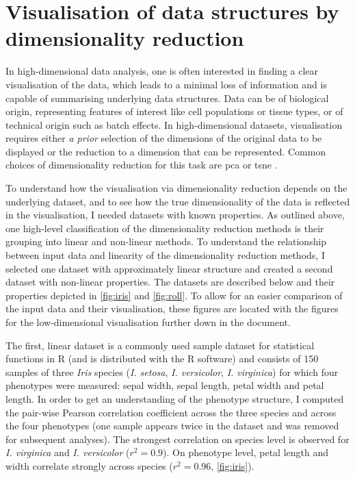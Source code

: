 \section{Visualisation of data structures by dimensionality reduction}
\label{section:visualisation}
In high-dimensional data analysis, one is often interested in finding a clear visualisation of the data, which leads to a minimal loss of information and is capable of summarising underlying data structures. Data can be of biological origin, representing features of interest like cell populations or tissue types, or of technical origin such as batch effects. In high-dimensional datasets, visualisation requires either \textit{a prior} selection of the dimensions of the original data to be displayed or the reduction to a dimension that can be represented. Common choices of dimensionality reduction for this task are \gls{pca} or \gls{tsne} \citep{Deng2014,Crowley2015,Corces2016,Martinez-Jimenez2017,Huisman2017}. 

To understand how the visualisation via dimensionality reduction depends on the underlying dataset, and to see how the true dimensionality of the data is reflected in the visualisation, I needed datasets with known properties. 
As outlined above, one high-level classification of the dimensionality reduction methods is their grouping into linear and non-linear methods. To understand the relationship between input data and linearity of the dimensionality reduction methods, I selected one dataset with approximately linear structure and created a second dataset with non-linear properties. The datasets are described below and their properties depicted in \cref{fig:iris} and \cref{fig:roll}. To allow for an easier comparison of the input data and their visualisation, these figures are located with the figures for the low-dimensional visualisation further down in the document.  

The first, linear dataset is a commonly used sample dataset for statistical functions in R (and is distributed with the R software) and consists of \num{150} samples of three \textit{Iris} species (\textit{I. setosa}, \textit{I. versicolor}, \textit{I. virginica}) for which four phenotypes were measured:  sepal width, sepal length, petal width and petal length. In order to get an understanding of the phenotype structure, I computed the pair-wise Pearson correlation coefficient across the three species and across the four phenotypes (one sample appears twice in the dataset and was removed for subsequent analyses). The strongest correlation on species level is observed for  \textit{I. virginica} and \textit{I. versicolor} (\(r^2=0.9\)). On phenotype level, petal length and width correlate strongly across species (\(r^2=0.96\), \cref{fig:iris}). 

